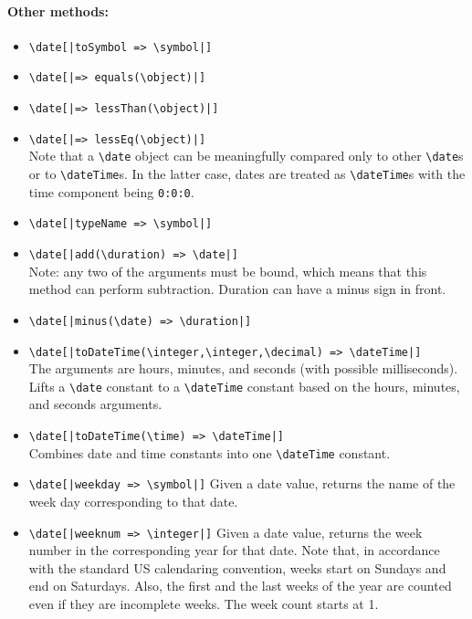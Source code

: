 \documentclass[11pt]{article}
\newcommand{\bs}{\textbackslash}
\begin{document}
\paragraph{Other methods:}
\begin{itemize}
\item {\tt \bs{}date[|toSymbol => \bs{}symbol|]}   
\item {\tt \bs{}date[|=> equals(\bs{}object)|]}   
\item {\tt \bs{}date[|=> lessThan(\bs{}object)|]}   
\item {\tt \bs{}date[|=> lessEq(\bs{}object)|]}   
  \\
  Note that a \texttt{\bs{}date} object can be meaningfully compared only
  to other
  \texttt{\bs{}date}s or to \texttt{\bs{}dateTime}s. In the latter case,
  dates are treated as \texttt{\bs{}dateTime}s with the time component
  being \texttt{0:0:0}. 
\item {\tt \bs{}date[|typeName => \bs{}symbol|]}   
\item {\tt \bs{}date[|add(\bs{}duration) => \bs{}date|]}   
  \\
  Note: any two of the arguments must be bound, which means that this
  method can perform subtraction.
  Duration can have a minus sign in front.
\item {\tt \bs{}date[|minus(\bs{}date) => \bs{}duration|]}   
\item {\tt \bs{}date[|toDateTime(\bs{}integer,\bs{}integer,\bs{}decimal) => \bs{}dateTime|]}    \\
  The arguments are hours, minutes, and seconds (with possible milliseconds).
  Lifts a \texttt{\bs{}date} constant to a \texttt{\bs{}dateTime} constant
  based on the hours, minutes, and seconds arguments.  
\item {\tt \bs{}date[|toDateTime(\bs{}time) => \bs{}dateTime|]}    \\
  Combines date and time constants into one \texttt{\bs{}dateTime}
  constant. 
  \item \texttt{\bs{}date[|weekday => \bs{}symbol|]}
  Given a date value, returns the name of the week day corresponding
  to that date.
\item \texttt{\bs{}date[|weeknum => \bs{}integer|]}
  Given a date value, returns the week number in the corresponding
  year for that date. Note that, in accordance with the standard US
  calendaring convention, weeks start on Sundays and end on Saturdays.
  Also, the first and the last weeks of the year are counted even if they
  are incomplete weeks. The week count starts at 1.

\end{itemize}
\end{document}
